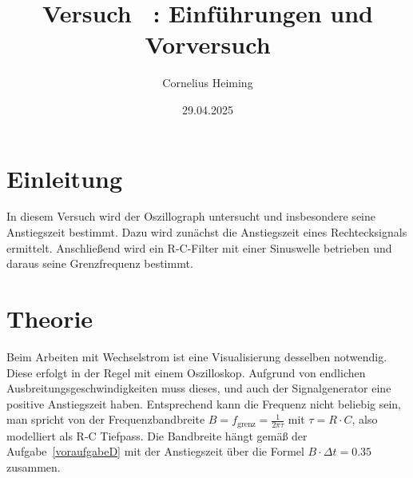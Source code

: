 \documentclass[ngerman]{scrartcl}
\author{Cornelius Heiming}
\title{Versuch \nummer~:  Einf\"uhrungen und Vorversuch}
\date{29.04.2025}
\theoremstyle{definition}
\begin{document}
	\maketitle
	\section{Einleitung}
		In diesem Versuch wird der Oszillograph untersucht und insbesondere seine Anstiegszeit bestimmt. Dazu wird zunächst die Anstiegszeit eines Rechtecksignals ermittelt. Anschließend wird ein R-C-Filter mit einer Sinuswelle betrieben und daraus seine Grenzfrequenz bestimmt. 
	\section{Theorie}

		Beim Arbeiten mit Wechselstrom ist eine Visualisierung desselben notwendig. Diese erfolgt in der Regel mit einem Oszilloskop. Aufgrund von endlichen Ausbreitungsgeschwindigkeiten muss dieses, und auch der Signalgenerator eine positive Anstiegszeit haben. Entsprechend kann die Frequenz nicht beliebig sein, man spricht von der Frequenzbandbreite $B = f_\mathrm{grenz} = \frac{1}{2\pi \tau}$ mit $\tau = R \cdot C$, also modelliert als R-C Tiefpass. Die Bandbreite hängt gemäß der Aufgabe~\ref{voraufgabeD} mit der Anstiegszeit über die Formel $B \cdot \Delta t = \SI{0,35}{}$ zusammen.
\end{document}
